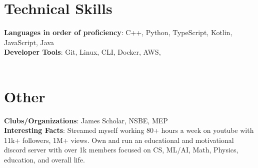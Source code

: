 \documentclass[letterpaper,10.99999999999999pt]{article}
\begin{document}
%
\begin{minipage}[t]{0.48\textwidth}
\section{Technical Skills}
 \begin{itemize}[leftmargin=0.15in, label={}]
    \small{\item{
     \textbf{Languages in order of proficiency}{: C++, Python, \newline TypeScript, Kotlin, JavaScript, Java} \\
     \textbf{Developer Tools}{: Git, Linux, CLI, Docker, AWS,} \\
     \hspace*{0em}{Pytorch, Tensorflow, Firebase, Transformers, HuggingFace, Supabase, Postgres} \\
    }}
 \end{itemize}
\end{minipage}
\hfill
\vrule
\hfill
\begin{minipage}[t]{0.48\textwidth}
\section{Other}
 \begin{itemize}[leftmargin=0.15in, label={}]
    \small{\item{
    \textbf{Clubs/Organizations}{: James Scholar, NSBE, MEP} \\
    \textbf{Interesting Facts}{: Streamed myself working 80+ hours a week on youtube with 11k+ followers, 1M+ views. \newline Own and run an educational and motivational discord server with over 1k members focused on CS, ML/AI, Math, Physics, education, and overall life.} \\
    }}
 \end{itemize}
\end{minipage}
\end{document}
